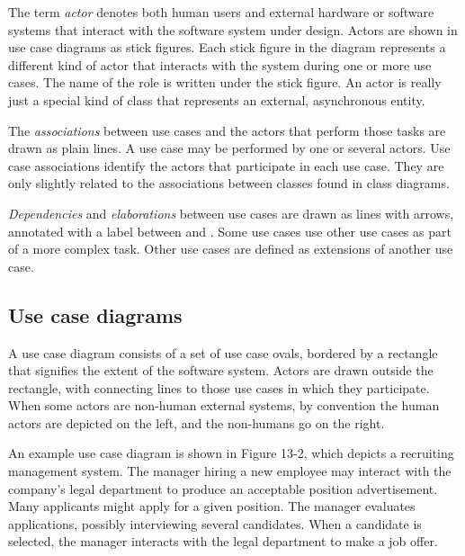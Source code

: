 The term \textit{actor} denotes both human users and
external hardware or software systems that interact with the software
system under design. Actors are shown in use case diagrams as stick
figures. Each stick figure in the diagram represents a different kind
of actor that interacts with the system during one or more use cases.
The name of the role is written under the stick figure. An
actor is really just a special kind of class that represents an
external, asynchronous entity.

The \textit{associations} between use cases
and the actors that perform those tasks are drawn as plain lines. A use
case may be performed by one or several
actors. Use case associations identify the actors that participate in
each use case. They are only slightly related to the associations
between classes found in class diagrams.

\textit{Dependencies} and \textit{elaborations} between use
cases are drawn as lines with arrows, annotated with a label between
\guillemotleft{ } and \guillemotright. Some use cases use other use cases as
part of a more complex task. Other use cases are defined as extensions of
another use case.

\subsection*{Use case diagrams}

A use case diagram consists of a set of use case ovals, bordered by a rectangle
that signifies the extent of the software system. Actors are drawn outside the
rectangle, with connecting lines to those use cases in which they
participate. When some actors are non-human external systems, by convention the
human actors are depicted on the left, and the non-humans go on the right.

An example use case diagram is shown in Figure 13-2, which depicts a
recruiting management system. The manager hiring a new employee may
interact with the company's legal department to
produce an acceptable position advertisement. Many applicants might
apply for a given position. The manager evaluates applications,
possibly interviewing several candidates. When a candidate is selected,
the manager interacts with the legal department to make a job offer.

